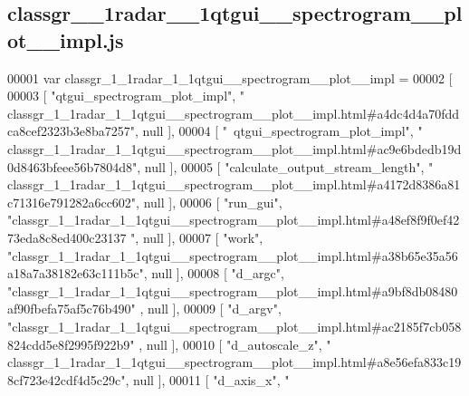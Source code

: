 \subsection{classgr\+\_\+\_\+1radar\+\_\+\_\+1qtgui\+\_\+\+\_\+spectrogram\+\_\+\+\_\+plot\+\_\+\+\_\+impl.\+js}
\label{classgr__1__1radar__1__1qtgui____spectrogram____plot____impl_8js_source}

\begin{DoxyCode}
00001 var classgr_1_1radar_1_1qtgui__spectrogram__plot__impl =
00002 [
00003     [ \textcolor{stringliteral}{"qtgui\_spectrogram\_plot\_impl"}, \textcolor{stringliteral}{"
      classgr\_1\_1radar\_1\_1qtgui\_\_spectrogram\_\_plot\_\_impl.html#a4dc4d4a70fddca8cef2323b3e8ba7257"}, null ],
00004     [ \textcolor{stringliteral}{"~qtgui\_spectrogram\_plot\_impl"}, \textcolor{stringliteral}{"
      classgr\_1\_1radar\_1\_1qtgui\_\_spectrogram\_\_plot\_\_impl.html#ac9e6bdedb19d0d8463bfeee56b7804d8"}, null ],
00005     [ \textcolor{stringliteral}{"calculate\_output\_stream\_length"}, \textcolor{stringliteral}{"
      classgr\_1\_1radar\_1\_1qtgui\_\_spectrogram\_\_plot\_\_impl.html#a4172d8386a81c71316e791282a6cc602"}, null ],
00006     [ \textcolor{stringliteral}{"run\_gui"}, \textcolor{stringliteral}{"classgr\_1\_1radar\_1\_1qtgui\_\_spectrogram\_\_plot\_\_impl.html#a48ef8f9f0ef4273eda8c8ed400c23137
      "}, null ],
00007     [ \textcolor{stringliteral}{"work"}, \textcolor{stringliteral}{"classgr\_1\_1radar\_1\_1qtgui\_\_spectrogram\_\_plot\_\_impl.html#a38b65e35a56a18a7a38182e63c111b5c"}, 
      null ],
00008     [ \textcolor{stringliteral}{"d\_argc"}, \textcolor{stringliteral}{"classgr\_1\_1radar\_1\_1qtgui\_\_spectrogram\_\_plot\_\_impl.html#a9bf8db08480af90fbefa75af5c76b490"}
      , null ],
00009     [ \textcolor{stringliteral}{"d\_argv"}, \textcolor{stringliteral}{"classgr\_1\_1radar\_1\_1qtgui\_\_spectrogram\_\_plot\_\_impl.html#ac2185f7cb058824cdd5e8f2995f922b9"}
      , null ],
00010     [ \textcolor{stringliteral}{"d\_autoscale\_z"}, \textcolor{stringliteral}{"
      classgr\_1\_1radar\_1\_1qtgui\_\_spectrogram\_\_plot\_\_impl.html#a8e56efa833c198cf723e42cdf4d5c29c"}, null ],
00011     [ \textcolor{stringliteral}{"d\_axis\_x"}, \textcolor{stringliteral}{"
}
\end{DoxyCode}
